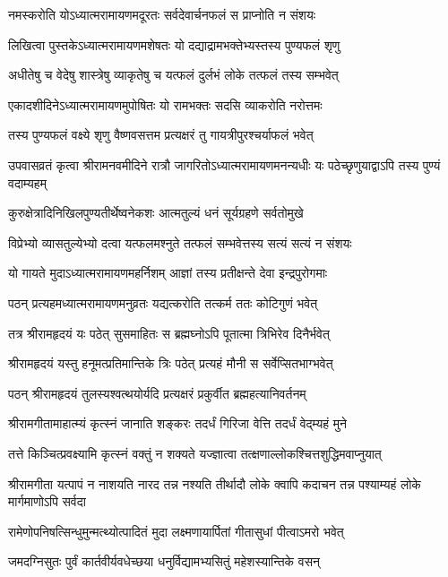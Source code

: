 \twolineshloka
{नमस्करोति योऽध्यात्मरामायणमदूरतः}
{सर्वदेवार्चनफलं स प्राप्नोति न संशयः} %

\twolineshloka
{लिखित्वा पुस्तकेऽध्यात्मरामायणमशेषतः}
{यो दद्याद्रामभक्तेभ्यस्तस्य पुण्यफलं शृणु} %

\twolineshloka
{अधीतेषु च वेदेषु शास्त्रेषु व्याकृतेषु च}
{यत्फलं दुर्लभं लोके तत्फलं तस्य सम्भवेत्} %

\twolineshloka
{एकादशीदिनेऽध्यात्मरामायणमुपोषितः}
{यो रामभक्तः सदसि व्याकरोति नरोत्तमः} %

\twolineshloka
{तस्य पुण्यफलं वक्ष्ये शृणु वैष्णवसत्तम}
{प्रत्यक्षरं तु गायत्रीपुरश्चर्याफलं भवेत्} %

\threelineshloka
{उपवासव्रतं कृत्वा श्रीरामनवमीदिने}
{रात्रौ जागरितोऽध्यात्मरामायणमनन्यधीः}
{यः पठेच्छृणुयाद्वाऽपि तस्य पुण्यं वदाम्यहम्} %

\twolineshloka
{कुरुक्षेत्रादिनिखिलपुण्यतीर्थेष्वनेकशः}
{आत्मतुल्यं धनं सूर्यग्रहणे सर्वतोमुखे} %

\twolineshloka
{विप्रेभ्यो व्यासतुल्येभ्यो दत्वा यत्फलमश्नुते}
{तत्फलं सम्भवेत्तस्य सत्यं सत्यं न संशयः} %

\twolineshloka
{यो गायते मुदाऽध्यात्मरामायणमहर्निशम्}
{आज्ञां तस्य प्रतीक्षन्ते देवा इन्द्रपुरोगमाः} %

\twolineshloka
{पठन् प्रत्यहमध्यात्मरामायणमनुव्रतः}
{यद्यत्करोति तत्कर्म ततः कोटिगुणं भवेत्} %

\twolineshloka
{तत्र श्रीरामहृदयं यः पठेत् सुसमाहितः}
{स ब्रह्मघ्नोऽपि पूतात्मा त्रिभिरेव दिनैर्भवेत्} %

\twolineshloka
{श्रीरामहृदयं यस्तु हनूमत्प्रतिमान्तिके}
{त्रिः पठेत् प्रत्यहं मौनी स सर्वेप्सितभाग्भवेत्} %

\twolineshloka
{पठन् श्रीरामहृदयं तुलस्यश्वत्थयोर्यदि}
{प्रत्यक्षरं प्रकुर्वीत ब्रह्महत्यानिवर्तनम्} %

\twolineshloka
{श्रीरामगीतामाहात्म्यं कृत्स्नं जानाति शङ्करः}
{तदर्धं गिरिजा वेत्ति तदर्धं वेद्म्यहं मुने} %

\twolineshloka
{तत्ते किञ्चित्प्रवक्ष्यामि कृत्स्नं वक्तुं न शक्यते}
{यज्ज्ञात्वा तत्क्षणाल्लोकश्चित्तशुद्धिमवाप्नुयात्} %

\threelineshloka
{श्रीरामगीता यत्पापं न नाशयति नारद}
{तन्न नश्यति तीर्थादौ लोके क्वापि कदाचन}
{तन्न पश्याम्यहं लोके मार्गमाणोऽपि सर्वदा} %

\twolineshloka
{रामेणोपनिषत्सिन्धुमुन्मत्थ्योत्पादितं मुदा}
{लक्ष्मणायार्पितां गीतासुधां पीत्वाऽमरो भवेत्} %

\twolineshloka
{जमदग्निसुतः पुर्वं कार्तवीर्यवधेच्छया}
{धनुर्विद्यामभ्यसितुं महेशस्यान्तिके वसन्} %

